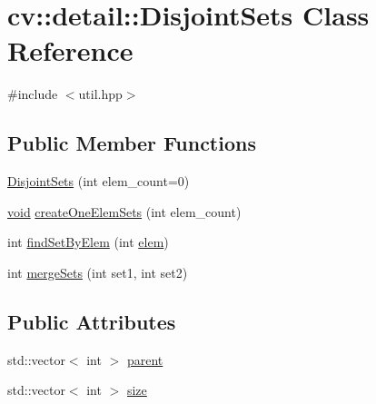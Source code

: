 \hypertarget{classcv_1_1detail_1_1DisjointSets}{\section{cv\-:\-:detail\-:\-:Disjoint\-Sets Class Reference}
\label{classcv_1_1detail_1_1DisjointSets}
}


{\ttfamily \#include $<$util.\-hpp$>$}

\subsection*{Public Member Functions}
\begin{DoxyCompactItemize}
\item 
\hyperlink{classcv_1_1detail_1_1DisjointSets_ab0c7e73d1acaaa2b48a1df5066b569de}{Disjoint\-Sets} (int elem\-\_\-count=0)
\item 
\hyperlink{legacy_8hpp_a8bb47f092d473522721002c86c13b94e}{void} \hyperlink{classcv_1_1detail_1_1DisjointSets_a840589dd0b4786c04f7505d238b60531}{create\-One\-Elem\-Sets} (int elem\-\_\-count)
\item 
int \hyperlink{classcv_1_1detail_1_1DisjointSets_a4f61a6ddc6663de58ad177d5ab92d943}{find\-Set\-By\-Elem} (int \hyperlink{core__c_8h_a3af7387cc1cc7f4c6c88660faa0c3aea}{elem})
\item 
int \hyperlink{classcv_1_1detail_1_1DisjointSets_ace5164c3b1500421c96c7b6cc4dfaa9d}{merge\-Sets} (int set1, int set2)
\end{DoxyCompactItemize}
\subsection*{Public Attributes}
\begin{DoxyCompactItemize}
\item 
std\-::vector$<$ int $>$ \hyperlink{classcv_1_1detail_1_1DisjointSets_a1663942a3058de8c0835cdc657fd3591}{parent}
\item 
std\-::vector$<$ int $>$ \hyperlink{classcv_1_1detail_1_1DisjointSets_a57434b53bae97ab6bedbb134acadc22b}{size}
\end{DoxyCompactItemize}


